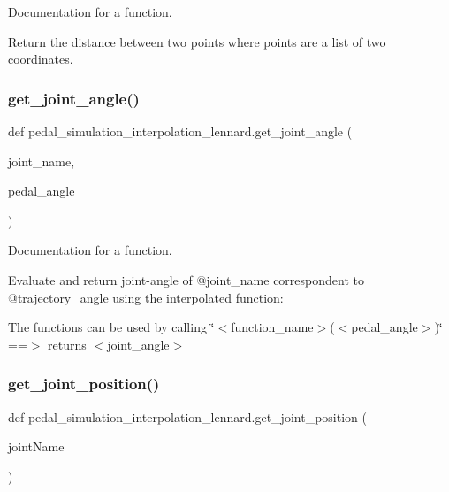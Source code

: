 Documentation for a function. 

Return the distance between two points where points are a list of two coordinates. \mbox{\label{namespacepedal__simulation__interpolation__lennard_ac3638bcbd02798c389a8a54186f250f9}} 
\subsubsection{\texorpdfstring{get\_joint\_angle()}{get\_joint\_angle()}}
{\footnotesize\ttfamily def pedal\+\_\+simulation\+\_\+interpolation\+\_\+lennard.\+get\+\_\+joint\+\_\+angle (\begin{DoxyParamCaption}\item[{}]{joint\+\_\+name,  }\item[{}]{pedal\+\_\+angle }\end{DoxyParamCaption})}



Documentation for a function. 

Evaluate and return joint-\/angle of @joint\+\_\+name correspondent to @trajectory\+\_\+angle using the interpolated function\+:

The functions can be used by calling \char`\"{}$<$function\+\_\+name$>$($<$pedal\+\_\+angle$>$)\char`\"{} ==$>$ returns $<$joint\+\_\+angle$>$ \mbox{\label{namespacepedal__simulation__interpolation__lennard_a0b60a370d2c02e0e44226668a0518cbf}} 
\subsubsection{\texorpdfstring{get\_joint\_position()}{get\_joint\_position()}}
{\footnotesize\ttfamily def pedal\+\_\+simulation\+\_\+interpolation\+\_\+lennard.\+get\+\_\+joint\+\_\+position (\begin{DoxyParamCaption}\item[{}]{joint\+Name }\end{DoxyParamCaption})}



